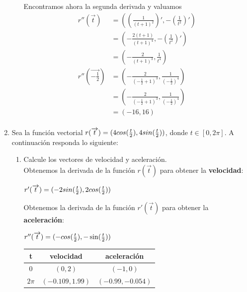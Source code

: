 \documentclass[10pt,letterpaper,fleqn]{article}
\begin{document}
\begin{enumerate}
\begin{itemize}
        	Encontramos ahora la segunda derivada y valuamos
        	\begin{equation*}
        	\begin{split}
        		r''(\overrightarrow{t}) &= \left(\left(\frac{1}{(t+1)^2}\right)',-\left(\frac{1}{t^2}\right)'\right) \\
        								&= \left(-\frac{2(t+1)}{(t+1)^4},-\left(\frac{1}{t^2}\right)'\right) \\
        								&= \left(-\frac{2}{(t+1)^3},\frac{1}{t^4}\right) \\
        		r''(\overrightarrow{-\frac{1}{2}}) &= \left(-\frac{2}{(-\frac{1}{2}+1)^3},\frac{1}{(-\frac{1}{2})^4}\right) \\
        								&= \left(-\frac{2}{(-\frac{1}{2}+1)^3},\frac{1}{(-\frac{1}{2})^4}\right) \\
        								&= \left(-16,16\right) \\
        	\end{split}
        	\end{equation*}


        \end{itemize}

        \item Sea la función vectorial $r (\overrightarrow{t}) = (4cos({t \over 2}),4sin({t \over 2}))$, donde $t \in [0,2\pi]$. A continuación responda lo siguiente:
        \begin{enumerate}
            \item Calcule los vectores de velocidad y aceleración.
            \\ Obtenemos la derivada de la función  $r (\overrightarrow{t})$ para obtener la {\bf velocidad}: 
            \begin{center}
                $r'(\overrightarrow{t}) = (-2sin({t \over 2}),2cos({t \over 2}))$ 
            \end{center}

            Obtenemos la derivada de la función $r'(\overrightarrow{t})$ para obtener la {\bf aceleración}:
            \begin{center}
                $r''(\overrightarrow{t}) = (-cos({t \over 2}),-\sin({t \over 2}))$ \\
                \begin{tabular}{|c|c|c|} \hline 
                    t & velocidad & aceleración \\ \hline
                    $0$ & $(0,2) $ & $(-1,0)$  \\ \hline
                    $2\pi$ & $(-0.109,1.99)$ & $(-0.99,-0.054)$  \\ \hline
                \end{tabular}
            \end{center}


\end{enumerate}
\end{enumerate}
\end{document}

